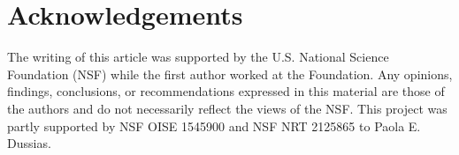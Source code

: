 \documentclass[output=paper,colorlinks,citecolor=brown]{langscibook}
\begin{document}
\section*{Acknowledgements}
The writing of this article was supported by the U.S. National Science Foundation (NSF) while the first author worked at the Foundation. Any opinions, findings, conclusions, or recommendations expressed in this material are those of the authors and do not necessarily reflect the views of the NSF. This project was partly supported by NSF OISE 1545900 and NSF NRT 2125865 to Paola E. Dussias.


\sloppy
\printbibliography[heading=subbibliography,notkeyword=this]
\end{document}
